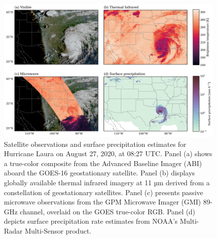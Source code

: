 \documentclass[11pt]{article}
\begin{document}
\begin{figure}[htbp] %
	\centering
	\includegraphics[width=1.0\textwidth]{figures/fig01}
	\caption{Satellite observations and surface precipitation estimates for Hurricane Laura on August 27, 2020, at 08:27 UTC. Panel (a) shows a true-color composite from the Advanced Baseline Imager (ABI) aboard the GOES-16 geostationary satellite. Panel (b) displays globally available thermal infrared imagery at 11 µm derived from a constellation of geostationary satellites. Panel (c) presents passive microwave observations from the GPM Microwave Imager (GMI) 89-GHz channel, overlaid on the GOES true-color RGB. Panel (d) depicts surface precipitation rate estimates from NOAA’s Multi-Radar Multi-Sensor product.}
	\label{fig:observations_conus}
\end{figure}
\end{document}

